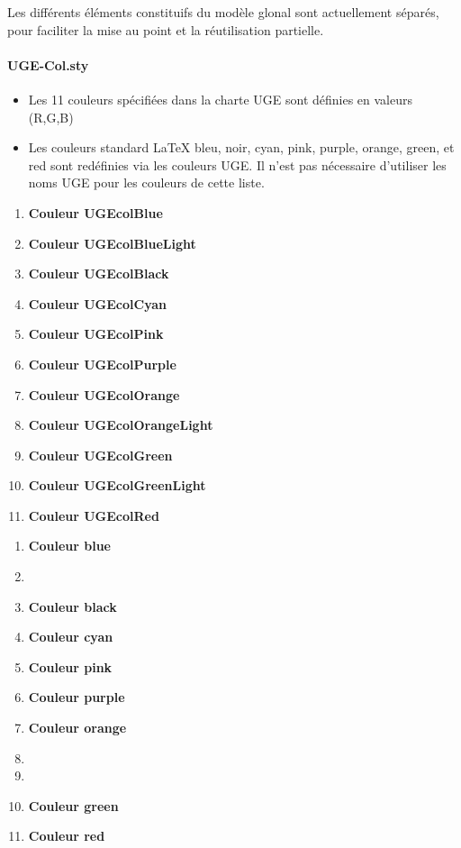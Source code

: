 Les différents éléments constituifs du modèle glonal sont actuellement séparés, pour faciliter la mise au point et la réutilisation partielle.

\newcommand{\UGEtext}[1]{%
  {\color{#1} \textbf{Couleur #1}}
}

\paragraph{UGE-Col.sty}

\begin{itemize}
\item Les 11 couleurs spécifiées dans la charte UGE sont définies en valeurs (R,G,B)
\item Les couleurs standard LaTeX bleu, noir, cyan, pink, purple, orange, green, et red sont redéfinies via les couleurs UGE. Il n'est pas nécessaire d'utiliser les noms UGE pour les couleurs de cette liste.
\end{itemize}

  \begin{minipage}[t]{.45\linewidth}  
    \begin{enumerate}
    \item \UGEtext{UGEcolBlue}
    \item \UGEtext{UGEcolBlueLight}
    \item \UGEtext{UGEcolBlack}
    \item \UGEtext{UGEcolCyan}
    \item \UGEtext{UGEcolPink}
    \item \UGEtext{UGEcolPurple}
    \item \UGEtext{UGEcolOrange}
    \item \UGEtext{UGEcolOrangeLight}
    \item \UGEtext{UGEcolGreen}
    \item \UGEtext{UGEcolGreenLight}
    \item \UGEtext{UGEcolRed}
    \end{enumerate}
  \end{minipage}
  \begin{minipage}[t]{.45\linewidth}  
    \begin{enumerate}
    \item \UGEtext{blue} 
    \item 
    \item \UGEtext{black} 
    \item \UGEtext{cyan} 
    \item \UGEtext{pink} 
    \item \UGEtext{purple}
    \item \UGEtext{orange}
    \item 
    \item 
    \item \UGEtext{green} 
    \item \UGEtext{red} 
    \end{enumerate}
  \end{minipage}



